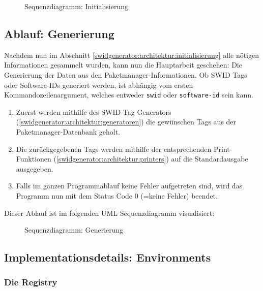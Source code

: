 \begin{figure}[H]
	\centering
	
	\caption{Sequenzdiagramm: Initialisierung}
\end{figure}

\subsection{Ablauf: Generierung}
\label{swidgenerator:architektur:generierung}

Nachdem nun im Abschnitt \ref{swidgenerator:architektur:initialisierung} alle
nötigen Informationen gesammelt wurden, kann nun die Hauptarbeit geschehen: Die
Generierung der Daten aus den Paketmanager-Informationen. Ob SWID Tags oder
Software-IDs generiert werden, ist abhängig vom ersten Kommandozeilenargument,
welches entweder \texttt{swid} oder \texttt{software-id} sein kann.

\begin{enumerate}
	\item Zuerst werden mithilfe des SWID Tag Generators
		(\ref{swidgenerator:architektur:generatoren}) die gewünschen Tags aus
		der Paketmanager-Datenbank geholt.
	\item Die zurückgegebenen Tags werden mithilfe der entsprechenden
		Print-Funktionen (\ref{swidgenerator:architektur:printers}) auf die
		Standardausgabe ausgegeben.
	\item Falls im ganzen Programmablauf keine Fehler aufgetreten sind, wird
		das Programm nun mit dem Status Code 0 (=keine Fehler) beendet.
\end{enumerate}

Dieser Ablauf ist im folgenden UML Sequenzdiagramm visualisiert:

\begin{figure}[H]
	\centering
	
	\caption{Sequenzdiagramm: Generierung}
\end{figure}


\subsection{Implementationsdetails: Environments}
\label{swidgenerator:architektur:environments}

\subsubsection{Die Registry}
\label{swidgenerator:architektur:environments:registry}

